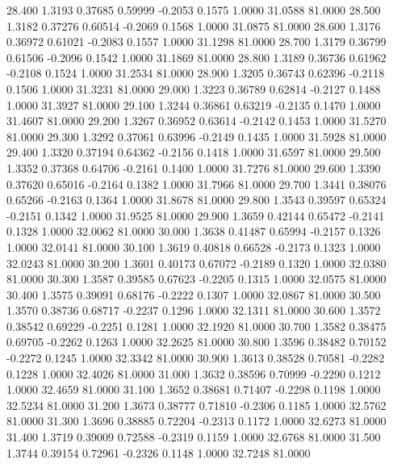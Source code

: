   28.400   1.3193   0.37685   0.59999  -0.2053   0.1575   1.0000  31.0588  81.0000
  28.500   1.3182   0.37276   0.60514  -0.2069   0.1568   1.0000  31.0875  81.0000
  28.600   1.3176   0.36972   0.61021  -0.2083   0.1557   1.0000  31.1298  81.0000
  28.700   1.3179   0.36799   0.61506  -0.2096   0.1542   1.0000  31.1869  81.0000
  28.800   1.3189   0.36736   0.61962  -0.2108   0.1524   1.0000  31.2534  81.0000
  28.900   1.3205   0.36743   0.62396  -0.2118   0.1506   1.0000  31.3231  81.0000
  29.000   1.3223   0.36789   0.62814  -0.2127   0.1488   1.0000  31.3927  81.0000
  29.100   1.3244   0.36861   0.63219  -0.2135   0.1470   1.0000  31.4607  81.0000
  29.200   1.3267   0.36952   0.63614  -0.2142   0.1453   1.0000  31.5270  81.0000
  29.300   1.3292   0.37061   0.63996  -0.2149   0.1435   1.0000  31.5928  81.0000
  29.400   1.3320   0.37194   0.64362  -0.2156   0.1418   1.0000  31.6597  81.0000
  29.500   1.3352   0.37368   0.64706  -0.2161   0.1400   1.0000  31.7276  81.0000
  29.600   1.3390   0.37620   0.65016  -0.2164   0.1382   1.0000  31.7966  81.0000
  29.700   1.3441   0.38076   0.65266  -0.2163   0.1364   1.0000  31.8678  81.0000
  29.800   1.3543   0.39597   0.65324  -0.2151   0.1342   1.0000  31.9525  81.0000
  29.900   1.3659   0.42144   0.65472  -0.2141   0.1328   1.0000  32.0062  81.0000
  30.000   1.3638   0.41487   0.65994  -0.2157   0.1326   1.0000  32.0141  81.0000
  30.100   1.3619   0.40818   0.66528  -0.2173   0.1323   1.0000  32.0243  81.0000
  30.200   1.3601   0.40173   0.67072  -0.2189   0.1320   1.0000  32.0380  81.0000
  30.300   1.3587   0.39585   0.67623  -0.2205   0.1315   1.0000  32.0575  81.0000
  30.400   1.3575   0.39091   0.68176  -0.2222   0.1307   1.0000  32.0867  81.0000
  30.500   1.3570   0.38736   0.68717  -0.2237   0.1296   1.0000  32.1311  81.0000
  30.600   1.3572   0.38542   0.69229  -0.2251   0.1281   1.0000  32.1920  81.0000
  30.700   1.3582   0.38475   0.69705  -0.2262   0.1263   1.0000  32.2625  81.0000
  30.800   1.3596   0.38482   0.70152  -0.2272   0.1245   1.0000  32.3342  81.0000
  30.900   1.3613   0.38528   0.70581  -0.2282   0.1228   1.0000  32.4026  81.0000
  31.000   1.3632   0.38596   0.70999  -0.2290   0.1212   1.0000  32.4659  81.0000
  31.100   1.3652   0.38681   0.71407  -0.2298   0.1198   1.0000  32.5234  81.0000
  31.200   1.3673   0.38777   0.71810  -0.2306   0.1185   1.0000  32.5762  81.0000
  31.300   1.3696   0.38885   0.72204  -0.2313   0.1172   1.0000  32.6273  81.0000
  31.400   1.3719   0.39009   0.72588  -0.2319   0.1159   1.0000  32.6768  81.0000
  31.500   1.3744   0.39154   0.72961  -0.2326   0.1148   1.0000  32.7248  81.0000
